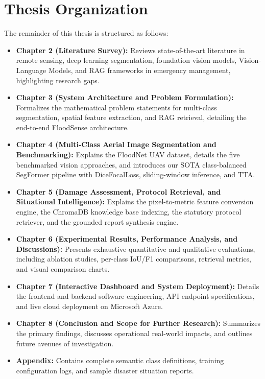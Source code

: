 \section{Thesis Organization}
The remainder of this thesis is structured as follows:
\begin{itemize}
    \item \textbf{Chapter 2 (Literature Survey):} Reviews state-of-the-art literature in remote sensing, deep learning segmentation, foundation vision models, Vision-Language Models, and RAG frameworks in emergency management, highlighting research gaps.
    \item \textbf{Chapter 3 (System Architecture and Problem Formulation):} Formalizes the mathematical problem statements for multi-class segmentation, spatial feature extraction, and RAG retrieval, detailing the end-to-end FloodSense architecture.
    \item \textbf{Chapter 4 (Multi-Class Aerial Image Segmentation and Benchmarking):} Explains the FloodNet UAV dataset, details the five benchmarked vision approaches, and introduces our SOTA class-balanced SegFormer pipeline with DiceFocalLoss, sliding-window inference, and TTA.
    \item \textbf{Chapter 5 (Damage Assessment, Protocol Retrieval, and Situational Intelligence):} Explains the pixel-to-metric feature conversion engine, the ChromaDB knowledge base indexing, the statutory protocol retriever, and the grounded report synthesis engine.
    \item \textbf{Chapter 6 (Experimental Results, Performance Analysis, and Discussions):} Presents exhaustive quantitative and qualitative evaluations, including ablation studies, per-class IoU/F1 comparisons, retrieval metrics, and visual comparison charts.
    \item \textbf{Chapter 7 (Interactive Dashboard and System Deployment):} Details the frontend and backend software engineering, API endpoint specifications, and live cloud deployment on Microsoft Azure.
    \item \textbf{Chapter 8 (Conclusion and Scope for Further Research):} Summarizes the primary findings, discusses operational real-world impacts, and outlines future avenues of investigation.
    \item \textbf{Appendix:} Contains complete semantic class definitions, training configuration logs, and sample disaster situation reports.
\end{itemize}
